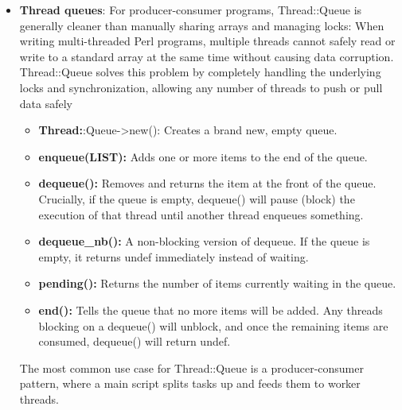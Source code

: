 \documentclass{report}
\begin{document}
\begin{itemize}
            \bigbreak \noindent 
            If you try to assign a normal, unshared reference into a shared array or hash, Perl will throw an error like "Invalid value for shared scalar". shared\_clone solves this by recursively cloning and sharing every component of the structure.
        \item \textbf{Thread queues}: For producer-consumer programs, Thread::Queue is generally cleaner than manually sharing arrays and managing locks:
            \bigbreak \noindent 
            When writing multi-threaded Perl programs, multiple threads cannot safely read or write to a standard array at the same time without causing data corruption. Thread::Queue solves this problem by completely handling the underlying locks and synchronization, allowing any number of threads to push or pull data safely
            \begin{itemize}
                \item \textbf{Thread:}:Queue->new(): Creates a brand new, empty queue.
                \item \textbf{enqueue(LIST):} Adds one or more items to the end of the queue.
                \item \textbf{dequeue():} Removes and returns the item at the front of the queue. Crucially, if the queue is empty, dequeue() will pause (block) the execution of that thread until another thread enqueues something.
                \item \textbf{dequeue\_nb():} A non-blocking version of dequeue. If the queue is empty, it returns undef immediately instead of waiting.
                \item \textbf{pending():} Returns the number of items currently waiting in the queue.
                \item \textbf{end():} Tells the queue that no more items will be added. Any threads blocking on a dequeue() will unblock, and once the remaining items are consumed, dequeue() will return undef.
            \end{itemize}
            \bigbreak \noindent 
            The most common use case for Thread::Queue is a producer-consumer pattern, where a main script splits tasks up and feeds them to worker threads.
            \bigbreak \noindent 
\end{itemize}
\end{document}
